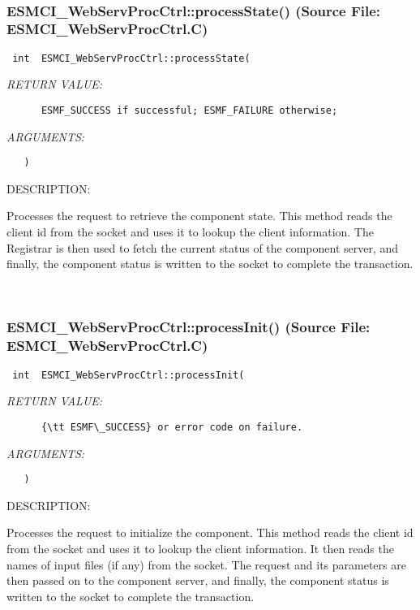  
\mbox{}\hrulefill\
 
\subsubsection{ESMCI\_WebServProcCtrl::processState() (Source File: ESMCI\_WebServProcCtrl.C)}


  
\begin{verbatim} int  ESMCI_WebServProcCtrl::processState(\end{verbatim}{\em RETURN VALUE:}
\begin{verbatim}      ESMF_SUCCESS if successful; ESMF_FAILURE otherwise;\end{verbatim}{\em ARGUMENTS:}
\begin{verbatim}   )\end{verbatim}
{\sf DESCRIPTION:\\ }


      Processes the request to retrieve the component state.  This method
      reads the client id from the socket and uses it to lookup the client
      information.  The Registrar is then used to fetch the current status
      of the component server, and finally, the component status is written
      to the socket to complete the transaction.
   
 
\mbox{}\hrulefill\
 
\subsubsection{ESMCI\_WebServProcCtrl::processInit() (Source File: ESMCI\_WebServProcCtrl.C)}


  
\begin{verbatim} int  ESMCI_WebServProcCtrl::processInit(\end{verbatim}{\em RETURN VALUE:}
\begin{verbatim}      {\tt ESMF\_SUCCESS} or error code on failure.\end{verbatim}{\em ARGUMENTS:}
\begin{verbatim}   )\end{verbatim}
{\sf DESCRIPTION:\\ }


      Processes the request to initialize the component.  This method reads the
      client id from the socket and uses it to lookup the client information.
      It then reads the names of input files (if any) from the socket.  The
      request and its parameters are then passed on to the component server,
      and finally, the component status is written to the socket to complete
      the transaction.
   
